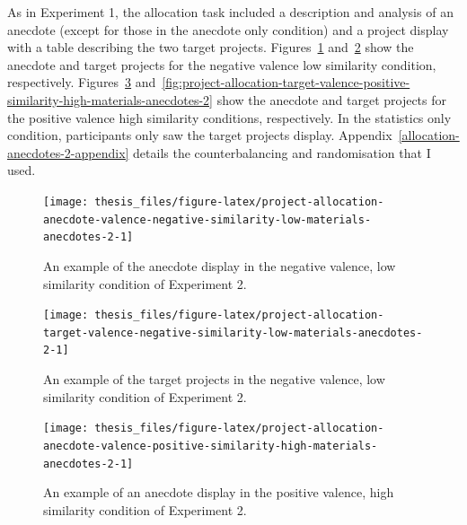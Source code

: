 \documentclass[a4paper, nobind, dvipsnames]{templates/ociamthesis}
\theoremstyle{definition}
\theoremstyle{definition}
\theoremstyle{definition}
\theoremstyle{definition}
\theoremstyle{remark}
\begin{document}
As in Experiment 1, the allocation task included a description and analysis of
an anecdote (except for those in the anecdote only condition) and a project
display with a table describing the two target projects.
Figures~\ref{fig:project-allocation-anecdote-valence-negative-similarity-low-materials-anecdotes-2}
and~\ref{fig:project-allocation-target-valence-negative-similarity-low-materials-anecdotes-2}
show the anecdote and target projects for the negative valence low similarity
condition, respectively.
Figures~\ref{fig:project-allocation-anecdote-valence-positive-similarity-high-materials-anecdotes-2}
and~\ref{fig:project-allocation-target-valence-positive-similarity-high-materials-anecdotes-2}
show the anecdote and target projects for the positive valence high similarity
conditions, respectively. In the statistics only condition, participants only
saw the target projects display. Appendix~\ref{allocation-anecdotes-2-appendix}
details the counterbalancing and randomisation that I used.



\begin{figure}
\texttt{[image: thesis\_files/figure-latex/project-allocation-anecdote-valence-negative-similarity-low-materials-anecdotes-2-1]} \caption{An example of the anecdote display in the negative valence, low similarity condition of Experiment 2.}\label{fig:project-allocation-anecdote-valence-negative-similarity-low-materials-anecdotes-2}
\end{figure}



\begin{figure}
\texttt{[image: thesis\_files/figure-latex/project-allocation-target-valence-negative-similarity-low-materials-anecdotes-2-1]} \caption{An example of the target projects in the negative valence, low similarity condition of Experiment 2.}\label{fig:project-allocation-target-valence-negative-similarity-low-materials-anecdotes-2}
\end{figure}



\begin{figure}
\texttt{[image: thesis\_files/figure-latex/project-allocation-anecdote-valence-positive-similarity-high-materials-anecdotes-2-1]} \caption{An example of an anecdote display in the positive valence, high similarity condition of Experiment 2.}\label{fig:project-allocation-anecdote-valence-positive-similarity-high-materials-anecdotes-2}
\end{figure}
\end{document}
